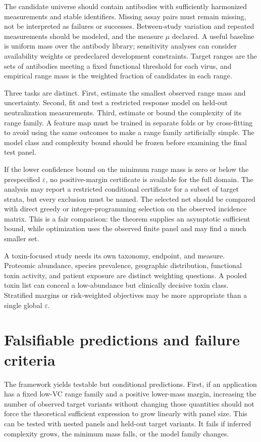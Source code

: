 \documentclass[11pt,a4paper]{article}
\newcommand{\eps}{\varepsilon}
\begin{document}
The candidate universe should contain antibodies with sufficiently harmonized measurements and stable identifiers. Missing assay pairs must remain missing, not be interpreted as failures or successes. Between-study variation and repeated measurements should be modeled, and the measure $\mu$ declared. A useful baseline is uniform mass over the antibody library; sensitivity analyses can consider availability weights or predeclared development constraints. Target ranges are the sets of antibodies meeting a fixed functional threshold for each virus, and empirical range mass is the weighted fraction of candidates in each range.

Three tasks are distinct. First, estimate the smallest observed range mass and uncertainty. Second, fit and test a restricted response model on held-out neutralization measurements. Third, estimate or bound the complexity of its range family. A feature map must be trained in separate folds or by cross-fitting to avoid using the same outcomes to make a range family artificially simple. The model class and complexity bound should be frozen before examining the final test panel.

If the lower confidence bound on the minimum range mass is zero or below the prespecified $\eps$, no positive-margin certificate is available for the full domain. The analysis may report a restricted conditional certificate for a subset of target strata, but every exclusion must be named. The selected net should be compared with direct greedy or integer-programming selection on the observed incidence matrix. This is a fair comparison: the theorem supplies an asymptotic sufficient bound, while optimization uses the observed finite panel and may find a much smaller set.

A toxin-focused study needs its own taxonomy, endpoint, and measure. Proteomic abundance, species prevalence, geographic distribution, functional toxin activity, and patient exposure are distinct weighting questions. A pooled toxin list can conceal a low-abundance but clinically decisive toxin class. Stratified margins or risk-weighted objectives may be more appropriate than a single global $\eps$.

\section{Falsifiable predictions and failure criteria}
The framework yields testable but conditional predictions. First, if an application has a fixed low-VC range family and a positive lower-mass margin, increasing the number of observed target variants without changing those quantities should not force the theoretical sufficient expression to grow linearly with panel size. This can be tested with nested panels and held-out target variants. It fails if inferred complexity grows, the minimum mass falls, or the model family changes.
\end{document}
